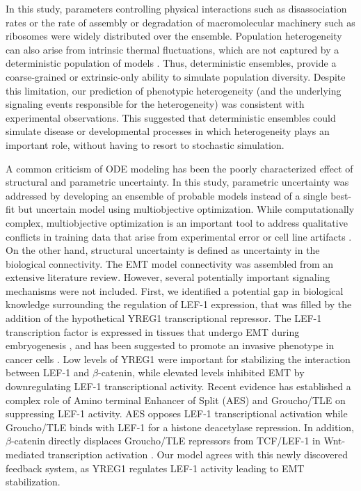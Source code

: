 \documentclass[12pt]{article}
\begin{document}
In this study, parameters controlling physical interactions such as disassociation rates or the rate of assembly or degradation of macromolecular machinery such as ribosomes were widely distributed over the ensemble. Population heterogeneity can also arise from intrinsic thermal fluctuations, which are not captured by a deterministic population of models \citep{Swain:2002ve}.
Thus, deterministic ensembles, provide a coarse-grained or extrinsic-only ability to simulate population diversity. Despite this limitation, our prediction of phenotypic heterogeneity
(and the underlying signaling events responsible for the heterogeneity) was consistent with experimental observations. This suggested that deterministic ensembles could simulate
disease or developmental processes in which heterogeneity plays an important role, without having to resort to stochastic simulation.

A common criticism of ODE modeling has been the poorly characterized effect of structural and parametric uncertainty.
In this study, parametric uncertainty was addressed by developing an ensemble of probable models instead of a single best-fit but uncertain model using multiobjective optimization.
While computationally complex, multiobjective optimization is an important tool to address qualitative conflicts in training data that arise from experimental error or cell line artifacts \citep{Handl:2007fk}. On the other hand, structural uncertainty is defined as uncertainty in the biological connectivity.
The EMT model connectivity was assembled from an extensive literature review. However, several potentially important signaling mechanisms were not included.
First, we identified a potential gap in biological knowledge surrounding the regulation of LEF-1 expression, that was filled by the addition of the hypothetical YREG1 transcriptional repressor.
The LEF-1 transcription factor is expressed in tissues that undergo EMT during embryogenesis \citep{Vega:2004qf,Nawshad:2003ff},
and has been suggested to promote an invasive phenotype in cancer cells \citep{Cano:2000kh,Kim:2002lh}.
Low levels of YREG1 were important for stabilizing the interaction between LEF-1 and $\beta$-catenin, while elevated levels inhibited EMT by downregulating LEF-1 transcriptional activity.
Recent evidence has established a complex role of Amino terminal Enhancer of Split (AES) and Groucho/TLE on suppressing LEF-1 activity.
AES opposes LEF-1 transcriptional activation while Groucho/TLE binds with LEF-1 for a histone deacetylase repression.
In addition, $\beta$-catenin directly displaces Groucho/TLE repressors from TCF/LEF-1 in Wnt-mediated transcription activation \citep{Arce:2009pr, Grumolato2013}.
Our model agrees with this newly discovered feedback system, as YREG1 regulates LEF-1 activity leading to EMT stabilization.
\end{document}
